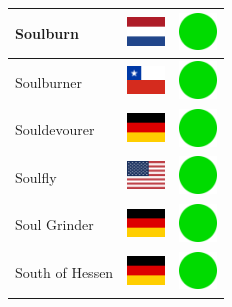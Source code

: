 \documentclass[12pt, a4paper, twoside]{report}
\begin{document}
\begin{center}
\begin{longtable}{|p{5cm}|p{2cm}|p{2cm}|}
 Soulburn                                                   & \includegraphics[width=1cm]{../4x3/nl} &   \includegraphics[width=1cm]{../likes/y} \\ \hline
 Soulburner                                                 & \includegraphics[width=1cm]{../4x3/cl} &   \includegraphics[width=1cm]{../likes/y} \\ \hline
 Souldevourer                                               & \includegraphics[width=1cm]{../4x3/de} &   \includegraphics[width=1cm]{../likes/y} \\ \hline
 Soulfly                                                    & \includegraphics[width=1cm]{../4x3/us} &   \includegraphics[width=1cm]{../likes/y} \\ \hline
 Soul Grinder                                               & \includegraphics[width=1cm]{../4x3/de} &   \includegraphics[width=1cm]{../likes/y} \\ \hline
 South of Hessen                                            & \includegraphics[width=1cm]{../4x3/de} &   \includegraphics[width=1cm]{../likes/y} \\ \hline

\end{longtable}
\end{center}
\end{document}
